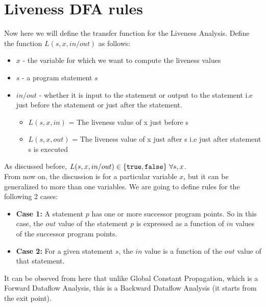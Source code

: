 \setlength{\parindent}{0pt}

\clearpage
\section{Liveness DFA rules}
Now here we will define the transfer function for the Liveness Analysis. Define the function $L(s,x,in/out)$ as follows:

\begin{itemize}
    \item $x$ - the variable for which we want to compute the liveness values
    \item $s$ - a program statement $s$
    \item $in/out$ - whether it is input to the statement or output to the statement i.e just before the statement or just after the statement.
    \begin{itemize}
        \item $L(s, x, in)$ = The liveness value of x just before s
        \item $L(s, x, out)$ = The liveness value of x just after s i.e just after statement s is executed
    \end{itemize}
\end{itemize}

As discussed before, $L(s,x,in/out) \in \{{\tt true}, {\tt false}\}~\forall s,x$.\\

From now on, the discussion is for a particular variable $x$, but it can be generalized to more than one variables. We are going to define rules for the following 2 cases:

\begin{itemize}
    \item \textbf{Case 1:} A statement $p$ has one or more successor program points. So in this case, the $out$ value of the statement $p$ is expressed as a function of $in$ values of the successor program points.
    \item \textbf{Case 2:} For a given statement $s$, the $in$ value is a function of the $out$ value of that statement.
\end{itemize}
It can be obseved from here that unlike Global Constant Propagation, which is a Forward Dataflow Analysis, this is a Backward Dataflow Analysis (it starts from the exit point).

